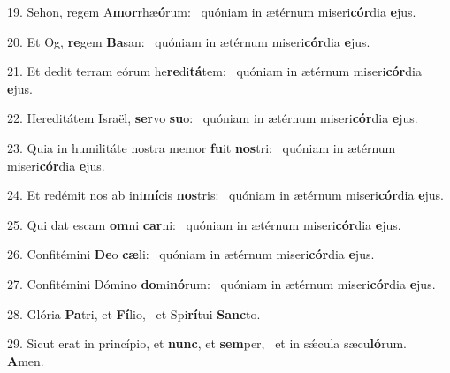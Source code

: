 19. Sehon, regem A\textbf{mor}rhæ\textbf{ó}rum: \ast\  quóniam in ætérnum miseri\textbf{cór}dia \textbf{e}jus.\

20. Et Og, \textbf{re}gem \textbf{Ba}san: \ast\  quóniam in ætérnum miseri\textbf{cór}dia \textbf{e}jus.\

21. Et dedit terram eórum he\textbf{re}di\textbf{tá}tem: \ast\  quóniam in ætérnum miseri\textbf{cór}dia \textbf{e}jus.\

22. Hereditátem Israël, \textbf{ser}vo \textbf{su}o: \ast\  quóniam in ætérnum miseri\textbf{cór}dia \textbf{e}jus.\

23. Quia in humilitáte nostra memor \textbf{fu}it \textbf{nos}tri: \ast\  quóniam in ætérnum miseri\textbf{cór}dia \textbf{e}jus.\

24. Et redémit nos ab ini\textbf{mí}cis \textbf{nos}tris: \ast\  quóniam in ætérnum miseri\textbf{cór}dia \textbf{e}jus.\

25. Qui dat escam \textbf{om}ni \textbf{car}ni: \ast\  quóniam in ætérnum miseri\textbf{cór}dia \textbf{e}jus.\

26. Confitémini \textbf{De}o \textbf{cæ}li: \ast\  quóniam in ætérnum miseri\textbf{cór}dia \textbf{e}jus.\

27. Confitémini Dómino \textbf{do}mi\textbf{nó}rum: \ast\  quóniam in ætérnum miseri\textbf{cór}dia \textbf{e}jus.\

28. Glória \textbf{Pa}tri, et \textbf{Fí}lio, \ast\  et Spi\textbf{rí}tui \textbf{Sanc}to.\

29. Sicut erat in princípio, et \textbf{nunc}, et \textbf{sem}per, \ast\  et in sǽcula sæcu\textbf{ló}rum. \textbf{A}men.\

